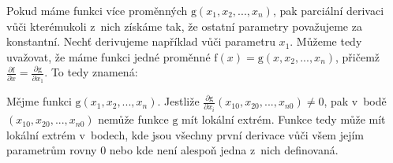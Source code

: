 Pokud máme funkci více proměnných \(\mathrm{g}(x_1, x_2, ..., x_n)\), pak parciální derivaci vůči kterémukoli z~nich získáme tak, že ostatní parametry považujeme za konstantní. Nechť derivujeme například vůči parametru \(x_1\). Můžeme tedy uvažovat, že máme funkci jedné proměnné \(\mathrm{f}(x) = \mathrm{g}(x, x_2, ..., x_n)\), přičemž \(\frac{\partial \mathrm{f}}{\partial x} = \frac{\partial \mathrm{g}}{\partial x_1}\). To tedy znamená:

\begin{fact}
Mějme funkci \(\mathrm{g}(x_1, x_2, ..., x_n)\). Jestliže \(\frac{\partial \mathrm{g}}{\partial x_i}(x_{10}, x_{20}, ..., x_{n0}) \neq 0\), pak v~bodě \((x_{10}, x_{20}, ..., x_{n0})\) nemůže funkce \(\mathrm{g}\) mít lokální extrém.
Funkce tedy může mít lokální extrém v~bodech, kde jsou všechny první derivace vůči všem jejím parametrům rovny 0 nebo kde není alespoň jedna z~nich definovaná.
\end{fact}
